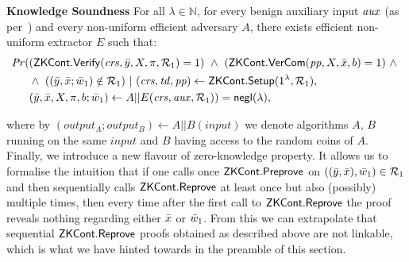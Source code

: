 \begin{definition}[ZK Continuations]
\noindent \textbf{Knowledge Soundness} For all $\lambda \in \mathbb{N}$, for every benign auxiliary input $\mathit{aux}$ (as per~\cite{bening_auxiliary}) and 
every non-uniform efficient adversary $A$, there exists efficient non-uniform extractor $E$ such that:
\begin{align*}
\mathit{Pr} (& ({\mathsf{ZKCont}}.{\mathsf{Verify}}(\mathit{crs}, \bar{y}, X, \pi, \mathcal{R}_1) = 1) \ \wedge \ ({\mathsf{ZKCont}}.{\mathsf{VerCom}}(\mathit{pp}, X, \bar{x}, b) = 1) \ \wedge\ \\
                   & \wedge \ ( (\bar{y}, \bar{x}; \bar{w}_1) \notin \mathcal{R}_1) \ | \ (\mathit{crs}, \mathit{td}, \mathit{pp}) \leftarrow {\ensuremath{\mathsf{ZKCont}}}.{\mathsf{Setup}} (1^{\lambda}, \mathcal{R}_1), \\
                   & (\bar{y}, \bar{x}, X, \pi, b; \bar{w}_1 ) \leftarrow A || E (\mathit{crs}, \mathit{aux}, \mathcal{R}_1)) = \mathsf{negl} (\lambda),
\end{align*}

\begin{comment}
\begin{align*}
\mathit{Pr} (& (\ZKCont.\Verify(\crs, \bar{y}, X, \pi, \relone) = 1) \ \wedge \ (\ZKCont.\VerifyCom(\pp, X, \bar{x}, b) = 1) \ \wedge\ \\
                   & \wedge \ ( (\bary, \barx; \baromega_1) \notin \relone) \ | \ (\crs, \pp) \leftarrow \ZKCont.\Setup (1^{\lambda}), \\
                   & (\bary, \barx, X, \pi, b; \baromega_1 ) \leftarrow A || E (\crs, \realaux, \relone)) = \negl (\lambda),
\end{align*}
\end{comment}

\noindent %
where by $(\mathit{output_{A}};\mathit{output_{B}}) \leftarrow A || B(\mathit{input})$ we denote algorithms $A$, $B$  running on the same 
$\mathit{input}$ and $B$ having access to the random coins of $A$. \\

\noindent Finally, we introduce a new flavour of zero-knowledge property. It allows us to formalise the intuition that if one calls once 
${\mathsf{ZKCont}}.{\mathsf{Preprove}}$ on $((\bar{y}, \bar{x}), \bar{w}_1) \in \mathcal{R}_1$ and 
then sequentially calls $ {\mathsf{ZKCont}}.{\mathsf{Reprove}} $ at least once but also (possibly) multiple times, 
then every time after the first call to $ {\mathsf{ZKCont}}.{\mathsf{Reprove}} $ the proof reveals nothing regarding either $\bar{x}$ or $\bar{w}_1$. From this we can 
extrapolate that sequential $ {\mathsf{ZKCont}}.{\mathsf{Reprove}} $ proofs obtained as described above are not linkable, which is what we have hinted towards 
in the preamble of this section. \\


\end{definition}
